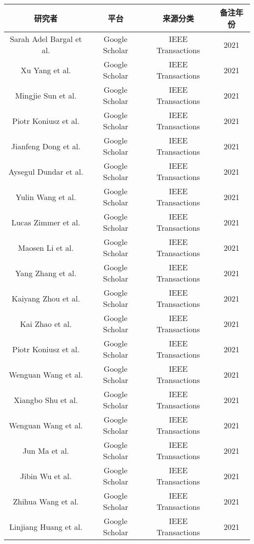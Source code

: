\begin{center}
\begin{tabular}{cccc}
\hline
研究者 & 平台 & 来源分类 & 备注年份  \\
\hline
Sarah Adel Bargal et al. \cite{sarahadel2021} & Google Scholar & IEEE Transactions & 2021 \\
Xu Yang et al. \cite{xuyang2021} & Google Scholar & IEEE Transactions & 2021 \\
Mingjie Sun et al. \cite{mingjie2021} & Google Scholar & IEEE Transactions & 2021 \\
Piotr Koniusz et al. \cite{piotr2021} & Google Scholar & IEEE Transactions & 2021 \\
Jianfeng Dong et al. \cite{jianfeng2021} & Google Scholar & IEEE Transactions & 2021 \\
Aysegul Dundar et al. \cite{aysegul2021} & Google Scholar & IEEE Transactions & 2021 \\
Yulin Wang et al. \cite{yulin2021} & Google Scholar & IEEE Transactions & 2021 \\
Lucas Zimmer et al. \cite{lucas2021} & Google Scholar & IEEE Transactions & 2021 \\
Maosen Li et al. \cite{maosen2021} & Google Scholar & IEEE Transactions & 2021 \\
Yang Zhang et al. \cite{yang2021} & Google Scholar & IEEE Transactions & 2021 \\
Kaiyang Zhou et al. \cite{kaiyang2021} & Google Scholar & IEEE Transactions & 2021 \\
Kai Zhao et al. \cite{kaizhao2021} & Google Scholar & IEEE Transactions & 2021 \\
Piotr Koniusz et al. \cite{piotrkoniusz2021} & Google Scholar & IEEE Transactions & 2021 \\
Wenguan Wang et al. \cite{wenguan2021} & Google Scholar & IEEE Transactions & 2021 \\
Xiangbo Shu et al. \cite{xiangbo2021} & Google Scholar & IEEE Transactions & 2021 \\
Wenguan Wang et al. \cite{tianfeizhou2021} & Google Scholar & IEEE Transactions & 2021 \\
Jun Ma et al. \cite{junma2021} & Google Scholar & IEEE Transactions & 2021 \\
Jibin Wu et al. \cite{jibinwu2021} & Google Scholar & IEEE Transactions & 2021 \\
Zhihua Wang et al. \cite{zhihuawang2021} & Google Scholar & IEEE Transactions & 2021 \\
Linjiang Huang et al. \cite{linjiang2021} & Google Scholar & IEEE Transactions & 2021 \\

\end{tabular}
\end{center}
